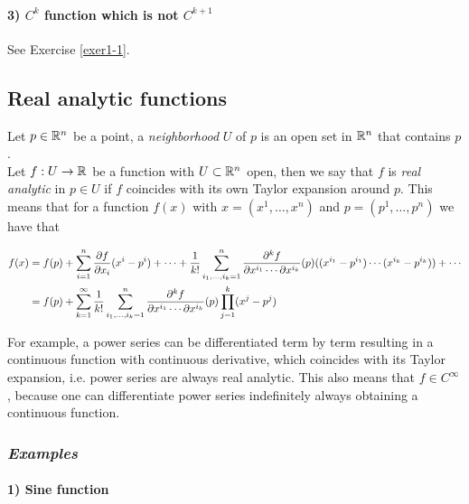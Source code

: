 \paragraph{3) $ C^{k} $ function which is not $ C^{k+1} $}

See Exercise \ref{exer1-1}.

\subsection{Real analytic functions}

Let $ p \in \mathbb{R}^{n} $ be a point, a \textit{neighborhood} $ U $ of $ p $ is an open set in $ \mathbb{R}^{n} $ that contains $ p $. \\
Let $ f : U \to \mathbb{R} $ be a function with $ U \subset \mathbb{R}^{n} $ open, then we say that $ f $ is \textit{real analytic} in $ p \in U $ if $ f $ coincides with its own Taylor expansion around $ p $. This means that for a function $ f (x) $ with $ x = (x^{1}, \dots, x^{n}) $ and $ p = (p^{1}, \dots, p^{n}) $ we have that

\begin{align}
	\begin{split}
		f (x) &= f (p) + \sum_{i=1}^{n} \pdv{f}{x_{i}} (p) (x^{i} - p^{i}) + \cdots + \dfrac{1}{k!} \sum_{i_{1},\dots,i_{k}=1}^{n} \dfrac{\partial^{k} f}{\partial x^{i_{1}} \cdots \partial x^{i_{k}}} (p) ( (x^{i_{1}} - p^{i_{1}}) \cdots (x^{i_{k}} - p^{i_{k}}) ) + \cdots \\
		&= f (p) + \sum_{k=1}^{\infty} \dfrac{1}{k!} \sum_{i_{1},\dots,i_{k}=1}^{n} \dfrac{\partial^{k} f}{\partial x^{i_{1}} \cdots \partial x^{i_{k}}} (p) \prod_{j=1}^{k} (x^{j} - p^{j})
	\end{split}
\end{align}

For example, a power series can be differentiated term by term resulting in a continuous function with continuous derivative, which coincides with its Taylor expansion, i.e. power series are always real analytic. This also means that $ f \in C^{\infty} $, because one can differentiate power series indefinitely always obtaining a continuous function.

\subsubsection{\textit{Examples}}

\paragraph{1) Sine function}

